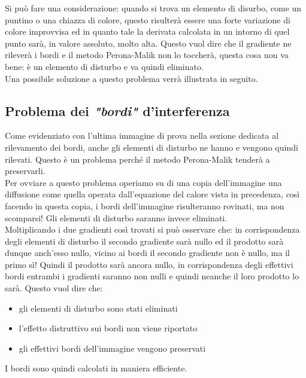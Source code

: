 Si può fare una considerazione: quando si trova un elemento di disurbo, come un puntino o una chiazza di colore, questo risulterà essere una forte variazione di colore improvvisa ed in quanto tale la derivata calcolata in un intorno di quel punto sarà, in valore assoluto, molto alta.
Questo vuol dire che il gradiente ne rileverà i bordi e il metodo Perona-Malik non lo toccherà, questa cosa non va bene: è un elemento di disturbo e va quindi eliminato.\\ 
Una possibile soluzione a questo problema verrà illustrata in seguito.\newpage


\newpage 
\subsection{Problema dei \textit{"bordi"} d'interferenza}
Come evidenziato con l'ultima immagine di prova nella sezione dedicata al rilevamento dei bordi, anche gli elementi di disturbo ne hanno e vengono quindi rilevati. Questo è un problema perché il metodo Perona-Malik tenderà a preservarli.\\
Per ovviare a questo problema operiamo su di una copia dell'immagine una diffusione come quella operata dall'equazione del calore vista in precedenza, così facendo in questa copia, i bordi dell'immagine risulteranno rovinati, ma non scomparsi! Gli elementi di disturbo saranno invece eliminati.\\
Moltiplicando i due gradienti così trovati si può osservare che: in corrispondenza degli elementi di disturbo il secondo gradiente sarà nullo ed il prodotto sarà dunque anch'esso nullo, vicino ai bordi il secondo gradiente non è nullo, ma il primo sì! Quindi il prodotto sarà ancora nullo, in corrispondenza degli effettivi bordi entrambi i gradienti saranno non nulli e quindi neanche il loro prodotto lo sarà. Questo vuol dire che:\\
\begin{itemize}
    \item gli elementi di disturbo sono stati eliminati
    \item l'effetto distruttivo sui bordi non viene riportato
    \item gli effettivi bordi dell'immagine vengono preservati
\end{itemize}
I bordi sono quindi calcolati in maniera efficiente.\\
\vspace{0em}

